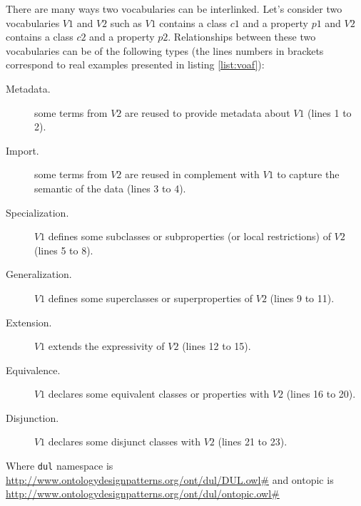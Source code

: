 \documentclass{iosart2c}
\begin{document}
There are many ways two vocabularies can be interlinked. Let's consider two vocabularies $V1$ and $V2$ such as $V1$ contains a class $c1$ and a property $p1$ and $V2$ contains a class $c2$ and a property $p2$. Relationships between these two vocabularies can be of the following types (the lines numbers in brackets correspond to real examples presented in listing \ref{list:voaf}):
		\begin{description}
			\item [Metadata.] some terms from $V2$ are reused to provide metadata about $V1$ (lines 1 to 2).

			\item [Import.] some terms from $V2$ are reused in complement with $V1$ to capture the semantic of the data (lines 3 to 4).

			\item [Specialization.] $V1$ defines some subclasses or subproperties (or local restrictions) of $V2$ (lines 5 to 8).

			\item [Generalization.] $V1$ defines some superclasses or superproperties of $V2$ (lines 9 to 11).

			\item [Extension.] $V1$ extends the expressivity of $V2$ (lines 12 to 15).

			\item [Equivalence.] $V1$ declares some equivalent classes or properties with $V2$ (lines 16 to 20).

			\item [Disjunction.] $V1$ declares some disjunct classes with $V2$ (lines 21 to 23).
		\end{description}
Where \texttt{dul} namespace is \url{http://www.ontologydesignpatterns.org/ont/dul/DUL.owl#} and ontopic is \url{http://www.ontologydesignpatterns.org/ont/dul/ontopic.owl#} 
\end{document}
